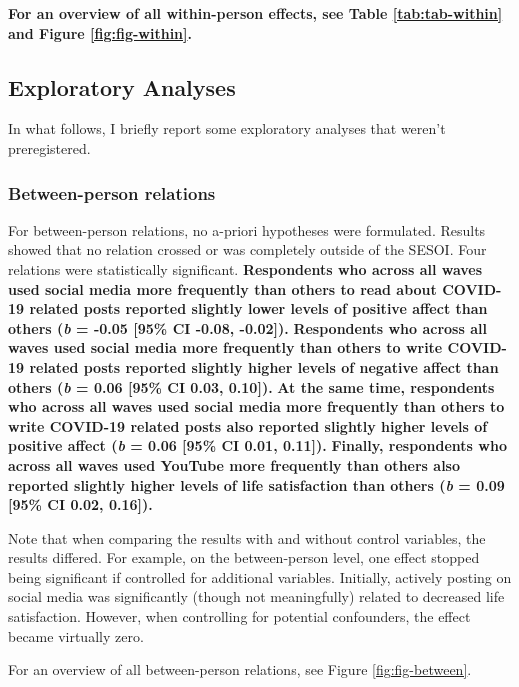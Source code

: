 \documentclass[
  man,mask]{apa7}
\begin{document}
\textbf{For an overview of all within-person effects, see Table \ref{tab:tab-within} and Figure \ref{fig:fig-within}.}

\hypertarget{exploratory-analyses}{%
\subsection{Exploratory Analyses}\label{exploratory-analyses}}

In what follows, I briefly report some exploratory analyses that weren't preregistered.

\hypertarget{between-person-relations}{%
\subsubsection{Between-person relations}\label{between-person-relations}}

For between-person relations, no a-priori hypotheses were formulated.
Results showed that no relation crossed or was completely outside of the SESOI.
Four relations were statistically significant.
\textbf{Respondents who across all waves used social media more frequently than others to read about COVID-19 related posts reported slightly lower levels of positive affect than others (\emph{b} = -0.05 {[}95\% CI -0.08, -0.02{]}).}
\textbf{Respondents who across all waves used social media more frequently than others to write COVID-19 related posts reported slightly higher levels of negative affect than others (\emph{b} = 0.06 {[}95\% CI 0.03, 0.10{]}).}
\textbf{At the same time, respondents who across all waves used social media more frequently than others to write COVID-19 related posts also reported slightly higher levels of positive affect (\emph{b} = 0.06 {[}95\% CI 0.01, 0.11{]}).}
\textbf{Finally, respondents who across all waves used YouTube more frequently than others also reported slightly higher levels of life satisfaction than others (\emph{b} = 0.09 {[}95\% CI 0.02, 0.16{]}).}

Note that when comparing the results with and without control variables, the results differed.
For example, on the between-person level, one effect stopped being significant if controlled for additional variables.
Initially, actively posting on social media was significantly (though not meaningfully) related to decreased life satisfaction.
However, when controlling for potential confounders, the effect became virtually zero.

For an overview of all between-person relations, see Figure \ref{fig:fig-between}.
\end{document}
